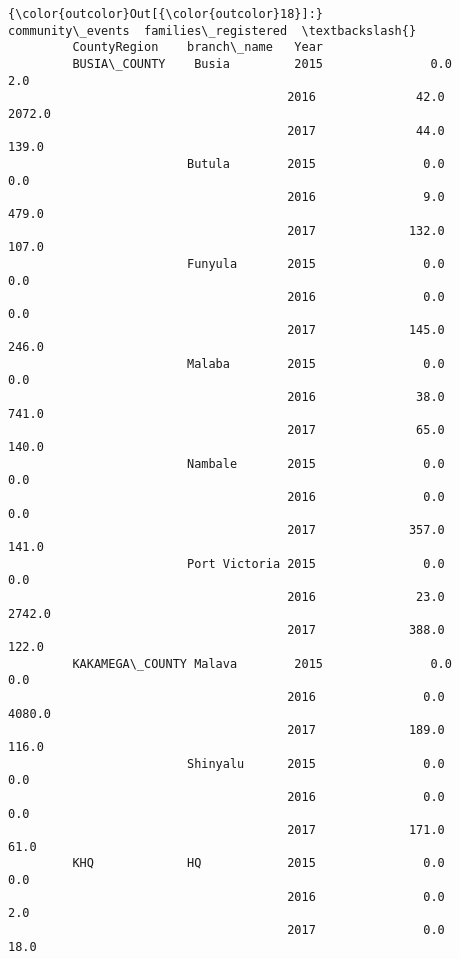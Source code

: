 \documentclass[11pt]{article}
\begin{document}
\begin{Verbatim}[commandchars=\\\{\}]
{\color{outcolor}Out[{\color{outcolor}18}]:}                                     community\_events  families\_registered  \textbackslash{}
         CountyRegion    branch\_name   Year                                          
         BUSIA\_COUNTY    Busia         2015               0.0                  2.0   
                                       2016              42.0               2072.0   
                                       2017              44.0                139.0   
                         Butula        2015               0.0                  0.0   
                                       2016               9.0                479.0   
                                       2017             132.0                107.0   
                         Funyula       2015               0.0                  0.0   
                                       2016               0.0                  0.0   
                                       2017             145.0                246.0   
                         Malaba        2015               0.0                  0.0   
                                       2016              38.0                741.0   
                                       2017              65.0                140.0   
                         Nambale       2015               0.0                  0.0   
                                       2016               0.0                  0.0   
                                       2017             357.0                141.0   
                         Port Victoria 2015               0.0                  0.0   
                                       2016              23.0               2742.0   
                                       2017             388.0                122.0   
         KAKAMEGA\_COUNTY Malava        2015               0.0                  0.0   
                                       2016               0.0               4080.0   
                                       2017             189.0                116.0   
                         Shinyalu      2015               0.0                  0.0   
                                       2016               0.0                  0.0   
                                       2017             171.0                 61.0   
         KHQ             HQ            2015               0.0                  0.0   
                                       2016               0.0                  2.0   
                                       2017               0.0                 18.0   

\end{Verbatim}
\end{document}
